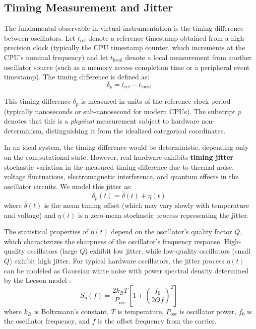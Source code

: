 \subsection{Timing Measurement and Jitter}

The fundamental observable in virtual instrumentation is the timing difference between oscillators. Let $t_{\text{ref}}$ denote a reference timestamp obtained from a high-precision clock (typically the CPU timestamp counter, which increments at the CPU's nominal frequency) and let $t_{\text{local}}$ denote a local measurement from another oscillator source (such as a memory access completion time or a peripheral event timestamp). The timing difference is defined as:
\begin{equation}
\delta_p = t_{\text{ref}} - t_{\text{local}}
\label{eq:timing_difference}
\end{equation}

This timing difference $\delta_p$ is measured in units of the reference clock period (typically nanoseconds or sub-nanosecond for modern CPUs). The subscript $p$ denotes that this is a \textit{physical} measurement subject to hardware non-determinism, distinguishing it from the idealized categorical coordinates.

In an ideal system, the timing difference would be deterministic, depending only on the computational state. However, real hardware exhibits \textbf{timing jitter}---stochastic variation in the measured timing difference due to thermal noise, voltage fluctuations, electromagnetic interference, and quantum effects in the oscillator circuits. We model this jitter as:
\begin{equation}
\delta_p(t) = \bar{\delta}(t) + \eta(t)
\label{eq:jitter_model}
\end{equation}
where $\bar{\delta}(t)$ is the mean timing offset (which may vary slowly with temperature and voltage) and $\eta(t)$ is a zero-mean stochastic process representing the jitter.

The statistical properties of $\eta(t)$ depend on the oscillator's quality factor $Q$, which characterizes the sharpness of the oscillator's frequency response. High-quality oscillators (large $Q$) exhibit low jitter, while low-quality oscillators (small $Q$) exhibit high jitter. For typical hardware oscillators, the jitter process $\eta(t)$ can be modeled as Gaussian white noise with power spectral density determined by the Leeson model \citep{leeson1966simple}:
\begin{equation}
S_\eta(f) = \frac{2 k_B T}{P_{\text{osc}}} \left[ 1 + \left(\frac{f_0}{2Q f}\right)^2 \right]
\label{eq:leeson_model}
\end{equation}
where $k_B$ is Boltzmann's constant, $T$ is temperature, $P_{\text{osc}}$ is oscillator power, $f_0$ is the oscillator frequency, and $f$ is the offset frequency from the carrier.

